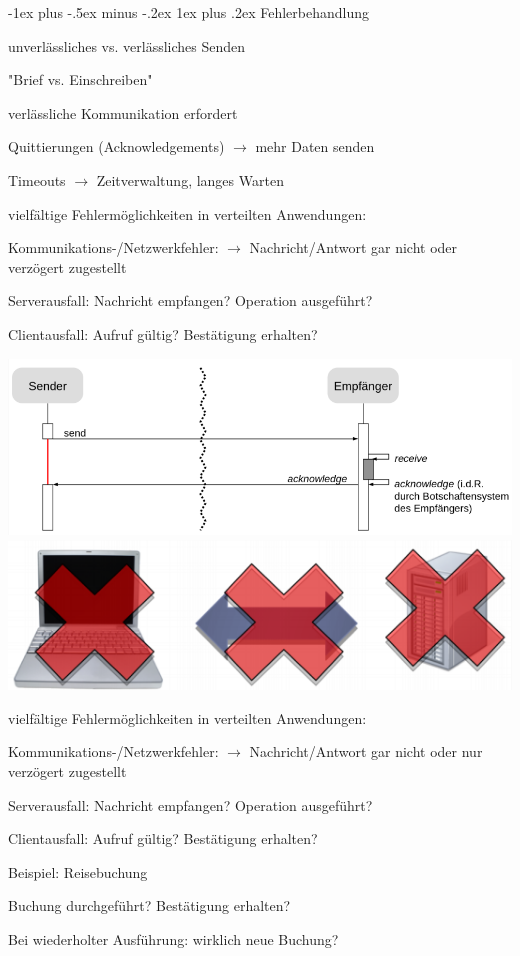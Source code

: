 \documentclass[10pt]{article}
\makeatletter
\renewcommand{\subsubsection}{\@startsection{subsubsection}{3}{0mm}%
                                {-1ex plus -.5ex minus -.2ex}%
                                {1ex plus .2ex}%
                                {\normalfont\small\bfseries}}
\makeatother
\begin{document}
\subsubsection{Fehlerbehandlung}
\begin{itemize*}
  \item unverlässliches vs. verlässliches Senden
  \begin{itemize*}
    \item "Brief vs. Einschreiben"
  \end{itemize*}
  \item verlässliche Kommunikation erfordert
  \begin{itemize*}
    \item Quittierungen (Acknowledgements) $\rightarrow$ mehr Daten senden
    \item Timeouts $\rightarrow$ Zeitverwaltung, langes Warten
  \end{itemize*}
  \item vielfältige Fehlermöglichkeiten in verteilten Anwendungen:
  \begin{itemize*}
    \item Kommunikations-/Netzwerkfehler: $\rightarrow$ Nachricht/Antwort gar nicht oder verzögert zugestellt
    \item Serverausfall: Nachricht empfangen? Operation ausgeführt?
    \item Clientausfall: Aufruf gültig? Bestätigung erhalten?
  \end{itemize*}
\end{itemize*}
\begin{center}
  \includegraphics[width=0.4\linewidth]{Assets/Programmierparadigmen-kommunikation-fehler}
  \includegraphics[width=0.4\linewidth]{Assets/Programmierparadigmen-kommunikation-fehler-2}
\end{center}

vielfältige Fehlermöglichkeiten in verteilten Anwendungen: 
\begin{itemize*}
  \item Kommunikations-/Netzwerkfehler: $\rightarrow$ Nachricht/Antwort gar nicht oder nur verzögert zugestellt
  \item Serverausfall: Nachricht empfangen? Operation ausgeführt?
  \item Clientausfall: Aufruf gültig? Bestätigung erhalten?
  \item Beispiel: Reisebuchung
  \begin{itemize*}
    \item Buchung durchgeführt? Bestätigung erhalten?
    \item Bei wiederholter Ausführung: wirklich neue Buchung?
  \end{itemize*}
\end{itemize*}
\end{document}

